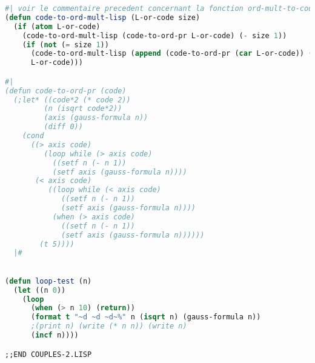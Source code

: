 \documentclass{article}
\begin{document}
\begin{lstlisting}[language=Lisp, basicstyle=\footnotesize]
#| voir le commentaire precedent concernant la fonction ord-mult-to-code-lisp |#
(defun code-to-ord-mult-lisp (L-or-code size)
  (if (atom L-or-code)
    (code-to-ord-mult-lisp (code-to-ord-pr L-or-code) (- size 1))
    (if (not (= size 1))
      (code-to-ord-mult-lisp (append (code-to-ord-pr (car L-or-code)) (cdr L-or-code)) (- size 1))
      L-or-code)))

#|
(defun code-to-ord-pr (code)
  (;let* ((code*2 (* code 2))
         (n (isqrt code*2))
         (axis (gauss-formula n))
         (diff 0))
    (cond 
      ((> axis code)
         (loop while (> axis code)
           ((setf n (- n 1)) 
           (setf axis (gauss-formula n))))
       (< axis code)
          ((loop while (< axis code)
             ((setf n (- n 1)) 
             (setf axis (gauss-formula n))))
           (when (> axis code)
             ((setf n (- n 1))
             (setf axis (gauss-formula n))))))
        (t 5))))
  |#           
  

(defun loop-test (n)
  (let ((n 0))
    (loop
      (when (> n 10) (return))
      (format t "~d ~d ~d~%" n (isqrt n) (gauss-formula n))
      ;(print n) (write (* n n)) (write n)
      (incf n))))

;;END COUPLES-2.LISP

\end{lstlisting}
\end{document}
